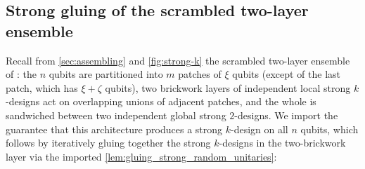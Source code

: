 \documentclass[
    aps,
    superscriptaddress,
    onecolumn,
    10pt,
    prx,
    nofootinbib
]{revtex4-2}
\theoremstyle{namedstatement}
\theoremstyle{plain}
\begin{document}
\subsection{Strong gluing of the scrambled two-layer ensemble}
\label{app:iterated-gluing}



Recall from \cref{sec:assembling} and \cref{fig:strong-k} the scrambled two-layer ensemble of \cite{SchusterEtAlStrong2025}: the $n$ qubits are partitioned into $m$ patches of $\xi$ qubits (except of the last patch, which has $\xi + \zeta$ qubits), two brickwork layers of independent local strong $k$-designs act on overlapping unions of adjacent patches, and the whole is sandwiched between two independent global strong $2$-designs. We import the guarantee that this architecture produces a strong $k$-design on all $n$ qubits, which follows by iteratively gluing together the strong $k$-designs in the two-brickwork layer via the imported \cref{lem:gluing_strong_random_unitaries}:
\end{document}
